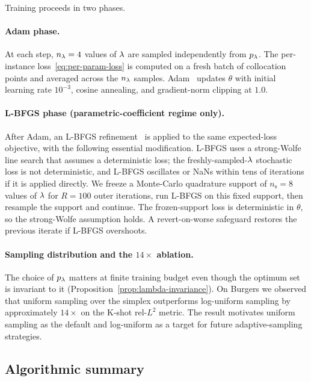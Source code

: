 \documentclass[12pt,a4paper]{extarticle}
\begin{document}
Training proceeds in two phases.

\paragraph{Adam phase.}
At each step, $n_\lambda = 4$ values of $\lambda$ are sampled independently from $p_\lambda$. The per-instance loss~\eqref{eq:per-param-loss} is computed on a fresh batch of collocation points and averaged across the $n_\lambda$ samples. Adam~\cite{kingma2015adam} updates $\theta$ with initial learning rate $10^{-3}$, cosine annealing, and gradient-norm clipping at $1.0$.

\paragraph{L-BFGS phase (parametric-coefficient regime only).}
After Adam, an L-BFGS refinement~\cite{liu1989limited} is applied to the same expected-loss objective, with the following essential modification. L-BFGS uses a strong-Wolfe line search that assumes a deterministic loss; the freshly-sampled-$\lambda$ stochastic loss is not deterministic, and L-BFGS oscillates or NaNs within tens of iterations if it is applied directly. We freeze a Monte-Carlo quadrature support of $n_{\mathrm{s}} = 8$ values of $\lambda$ for $R = 100$ outer iterations, run L-BFGS on this fixed support, then resample the support and continue. The frozen-support loss is deterministic in $\theta$, so the strong-Wolfe assumption holds. A revert-on-worse safeguard restores the previous iterate if L-BFGS overshoots.

\paragraph{Sampling distribution and the $14\times$ ablation.}
The choice of $p_\lambda$ matters at finite training budget even though the optimum set is invariant to it (Proposition~\ref{prop:lambda-invariance}). On Burgers we observed that uniform sampling over the simplex outperforms log-uniform sampling by approximately $14\times$ on the K-shot rel-$L^2$ metric. The result motivates uniform sampling as the default and log-uniform as a target for future adaptive-sampling strategies.

\subsection{Algorithmic summary}
\end{document}
